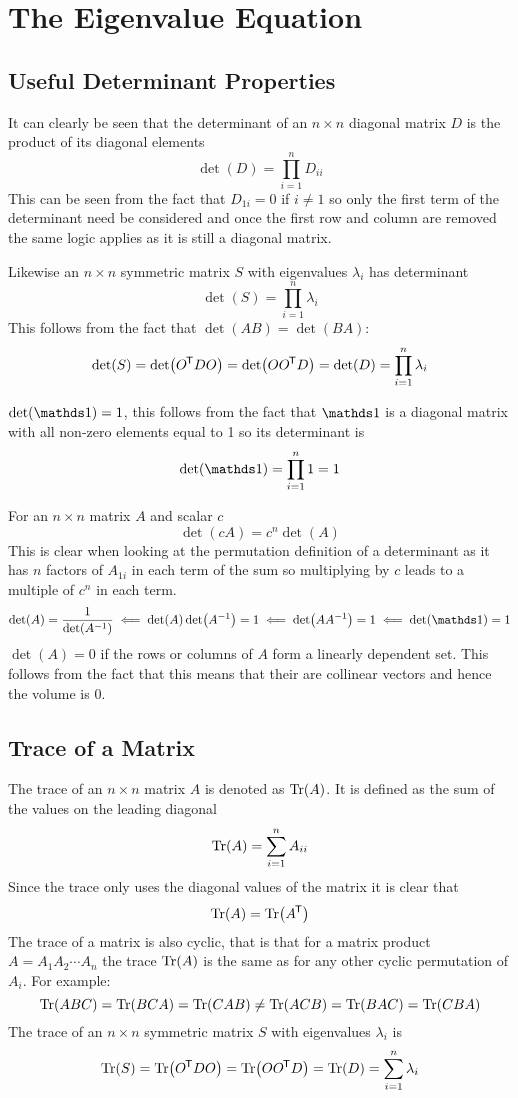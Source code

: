 \documentclass{article}
\begin{document}
    \section{The Eigenvalue Equation}
    \subsection{Useful Determinant Properties}
    It can clearly be seen that the determinant of an \(n\times n\) diagonal matrix \(D\) is the product of its diagonal elements
    \[\det(D) = \prod_{i=1}^n D_{ii}\]
    This can be seen from the fact that \(D_{1i} = 0\) if \(i\ne 1\) so only the first term of the determinant need be considered and once the first row and column are removed the same logic applies as it is still a diagonal matrix.
    
    Likewise an \(n\times n\) symmetric matrix \(S\) with eigenvalues \(\lambda_i\) has determinant
    \[\det(S) = \prod_{i=1}^n \lambda_i\]
    This follows from the fact that \(\det(AB) = \det(BA)\):
    \[\det(S) = \det(O^{\mkern-1.5mu\mathsf{T}} DO) = \det(OO^{\mkern-1.5mu\mathsf{T}} D) = \det(D) = \prod_{i=1}^n \lambda_i\]
    
    \(\det(\ident) = 1\), this follows from the fact that \(\ident\) is a diagonal matrix with all non-zero elements equal to 1 so its determinant is
    \[\det(\ident) = \prod_{i=1}^n 1 = 1\]
    
    For an \(n\times n\) matrix \(A\) and scalar \(c\)
    \[\det(cA) = c^n\det(A)\]
    This is clear when looking at the permutation definition of a determinant as it has \(n\) factors of \(A_{1i}\) in each term of the sum so multiplying by \(c\) leads to a multiple of \(c^n\) in each term.
    \[\det(A) = \frac{1}{\det(A^{-1})}\impliedby\det(A)\det(A^{-1}) = 1\impliedby \det(AA^{-1})= 1\impliedby \det(\ident) = 1\]
    \(\det(A) = 0\) if the rows or columns of \(A\) form a linearly dependent set. 
    This follows from the fact that this means that their are collinear vectors and hence the volume is 0.
    
    \subsection{Trace of a Matrix}
    The trace of an \(n\times n\) matrix \(A\) is denoted as \(\Tr(A)\). 
    It is defined as the sum of the values on the leading diagonal
    \[\Tr(A) = \sum_{i=1}^n A_{ii}\]
    Since the trace only uses the diagonal values of the matrix it is clear that
    \[\Tr(A) = \Tr(A^{\mkern-1.5mu\mathsf{T}})\]
    The trace of a matrix is also cyclic, that is that for a matrix product \(A = A_1A_2\dotsb A_n\) the trace \(\Tr(A)\) is the same as for any other cyclic permutation of \(A_i\). For example:
    \[\Tr(ABC) = \Tr(BCA) = \Tr(CAB) \ne \Tr(ACB) = \Tr(BAC) = \Tr(CBA)\]
    The trace of an \(n\times n\) symmetric matrix \(S\) with eigenvalues \(\lambda_i\) is
    \[\Tr(S) = \Tr(O^{\mkern-1.5mu\mathsf{T}} DO) = \Tr(OO^{\mkern-1.5mu\mathsf{T}} D) = \Tr(D) = \sum_{i=1}^n \lambda_i\]
    
\end{document}
